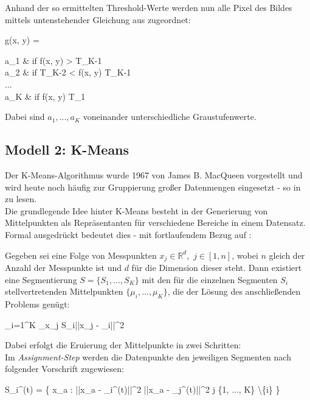 		Anhand der so ermittelten Threshold-Werte werden nun alle Pixel des Bildes mittels untenstehender Gleichung aus \cite[S. 739]{gonzalez-woods} zugeordnet:
		\begin{flalign}
			\centering
			g(x, y) = 
			\begin{cases}
				a_{1} & \textrm{if } f(x, y) > T_{K-1}\\
				a_{2} & \textrm{if } T_{K-2} < f(x, y) \leq T_{K-1}\\
				... \\
				a_{K} & \textrm{if } f(x, y) \leq T_{1}
			\end{cases}
			\label{eq:threshold}
		\end{flalign}
		Dabei sind $a_{1}, ..., a_{K}$ voneinander unterschiedliche Graustufenwerte.
	
	\subsection{Modell 2: K-Means}
	\label{sec:meth2}
	
		Der K-Means-Algorithmus wurde 1967 von James B. MacQueen \cite{macqueen-kmeans} vorgestellt und wird heute noch häufig zur Gruppierung großer Datenmengen eingesetzt - so in \cite{kmeans-info} zu lesen.\\
		Die grundlegende Idee hinter K-Means besteht in der Generierung von Mittelpunkten als Repräsentanten für verschiedene Bereiche in einem Datensatz. Formal ausgedrückt bedeutet dies - mit fortlaufendem Bezug auf \cite{mozdren-meth2}:
		\begin{definition}
			\label{def:kmeans1}
			Gegeben sei eine Folge von Messpunkten $x_{j} \in \mathbb{R}^{d},$ $j \in [1,n]$, wobei $n$ gleich der Anzahl der Messpunkte ist und $d$ für die Dimension dieser steht. Dann existiert eine Segmentierung $S = \{S_{1}, ..., S_{K}\}$ mit den für die einzelnen Segmenten $S_{i}$ stellvertretenden Mittelpunkten $\{\mu_{i}, ..., \mu_{K}\}$, die der Lösung des anschließenden Problems genügt:
			\begin{flalign}
				\centering
				 \sum_{i=1}^{K} \sum_{x_{j} \in S_{i}}\left|\left|x_{j} - \mu_{i}\right|\right|^{2}
			\end{flalign}
		\end{definition}
		Dabei erfolgt die Eruierung der Mittelpunkte in zwei Schritten:\\
		Im \textit{Assignment-Step} werden die Datenpunkte den jeweiligen Segmenten nach folgender Vorschrift zugewiesen:
		\begin{flalign}
			S_{i}^{(t)} = \left\{ x_{a} : \left|\left|x_{a} - \mu_{i}^{(t)}\right|\right|^{2} \leq \left|\left|x_{a} - \mu_{j^{(t)}}\right|\right|^{2} \forall j \in \{1, ..., K\} \textbackslash \{i\}  \right\}
		\end{flalign}